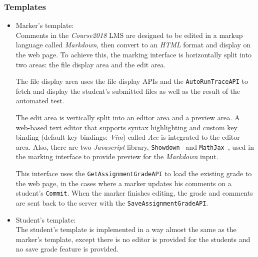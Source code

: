 \subsubsection{Templates}
    \begin{itemize}
        \item Marker's template: \\
        Comments in the \emph{Course2018} LMS are designed to be edited in
        a markup language called \emph{Markdown}, then convert to an \emph{HTML}
        format and display on the web page.
        To achieve this, the marking interface is horizontally
        split into two areas: the file display area and the edit area.

        The file display area uses the file display APIs and the 
        \texttt{AutoRunTraceAPI}
        to fetch and display the student's submitted files as well
        as the result of the automated test.

        The edit area is vertically split into an editor area and a
        preview area. A web-based text editor that supports syntax highlighting
        and custom key binding (default key bindings: \emph{Vim})
        called \emph{Ace} \cite{aceEditor} is integrated to the editor area.
        Also, there are two \emph{Javascript} library,
        \texttt{Showdown}~\cite{showdown} and \texttt{MathJax}~\cite{mathjax},
        used in the marking interface to provide preview for the \emph{Markdown}
        input.

        This interface uses the \texttt{GetAssignmentGradeAPI} to load the
        existing grade to the web page, in the cases where a marker updates
        his comments on a student's \texttt{Commit}. When the marker finishes
        editing, the grade and comments are sent back to the server with the
        \texttt{SaveAssignmentGradeAPI}.

        \item Student's template: \\
        The student's template is implemented in a way almost the same as the
        marker's template, except there is no editor is provided for the
        students and no save grade feature is provided.
    \end{itemize}